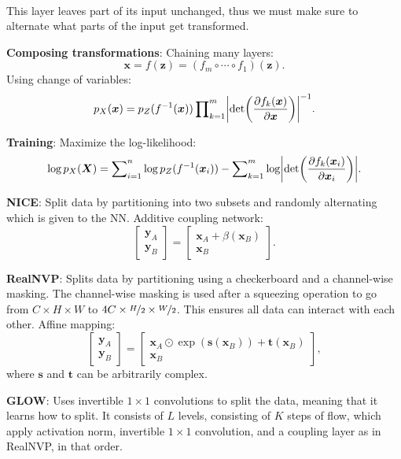 \documentclass{article}
\newcommand{\lft}{\mathopen{}\mathclose\bgroup\left}
\newcommand{\rgt}{\aftergroup\egroup\right}
\renewcommand{\vec}[1]{\bm{#1}}
\newcommand{\mat}[1]{\bm{#1}}
\newenvironment{topic}[1]
{\textbf{\sffamily \colorbox{black}{\rlap{\textbf{\textcolor{white}{#1}}}\hspace{\linewidth}\hspace{-2\fboxsep}}} \\ \vspace{0.2cm}}
{}
\begin{document}
\begin{multicols*}{2}
\begin{topic}{Normalizing flow}
        This layer leaves part of its input unchanged, thus we must make sure to alternate what parts of
        the input get transformed.

        \textbf{Composing transformations}: Chaining many layers: \[
            \vec{x} = f(\vec{z}) = (f_m \circ \cdots \circ f_1)(\vec{z}).
        \]
        Using change of variables: \[
            p_X(\vec{x}) = p_Z(f^{-1}(\vec{x})) \prod\nolimits_{k=1}^m \lft| \det\lft( \pdv{f_k(\vec{x})}{\vec{x}} \rgt) \rgt|^{-1}.
        \]

        \textbf{Training}: Maximize the log-likelihood: \[
            \log p_{X}(\mat{X}) = \sum\nolimits_{i=1}^{n} \log p_Z(f^{-1}(\vec{x}_i)) - \sum\nolimits_{k=1}^{m} \log \lft| \det\lft( \pdv{f_k(\vec{x}_i)}{\vec{x}_i} \rgt) \rgt|.
        \]

        \textbf{NICE}: Split data by partitioning into two subsets and randomly alternating which is given to the NN. Additive coupling network: \[
            \begin{bmatrix} \vec{y}_A \\ \vec{y}_B \end{bmatrix}
            =
            \begin{bmatrix} \vec{x}_A + \beta(\vec{x}_B) \\ \vec{x}_B \end{bmatrix}.
        \]

        \textbf{RealNVP}: Splits data by partitioning using a checkerboard and a channel-wise
        masking. The channel-wise masking is used after a squeezing operation to go from $C\times H
            \times W$ to $4C \times \nicefrac{H}{2} \times \nicefrac{W}{2}$. This ensures all data can interact with each other. Affine mapping: \[
            \begin{bmatrix} \vec{y}_A \\ \vec{y}_B \end{bmatrix} = \begin{bmatrix} \vec{x}_A \odot \exp(\vec{s}(\vec{x}_B)) + \vec{t}(\vec{x}_B) \\ \vec{x}_B \end{bmatrix},
        \]
        where $\vec{s}$ and $\vec{t}$ can be arbitrarily complex.

        \textbf{GLOW}: Uses invertible $1\times 1$ convolutions to split the data, meaning that it
        learns how to split. It consists of $L$ levels, consisting of $K$ steps of flow, which apply
        activation norm, invertible $1 \times 1$ convolution, and a coupling layer as in RealNVP, in
        that order.


\end{topic}
\end{multicols*}
\end{document}
